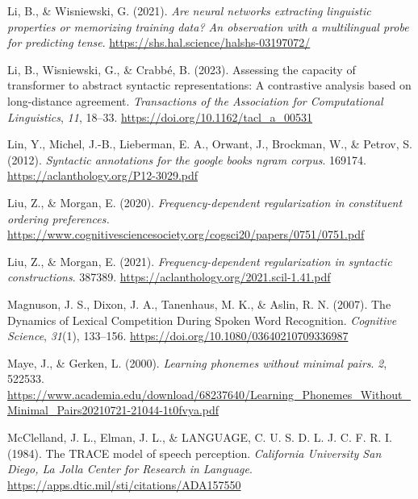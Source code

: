 \documentclass[
  12pt,
  letterpaper,
]{scrreprt}
\newlength{\cslhangindent}
\newenvironment{CSLReferences}[2] %
 {\begin{list}{}{%
  \setlength{\itemindent}{0pt}
  \setlength{\leftmargin}{0pt}
  \setlength{\parsep}{0pt}
  \ifodd #1
   \setlength{\leftmargin}{\cslhangindent}
   \setlength{\itemindent}{-1\cslhangindent}
  \fi
  \setlength{\itemsep}{#2\baselineskip}}}
 {\end{list}}
\begin{document}
\begin{CSLReferences}{1}{0}
Li, B., \& Wisniewski, G. (2021). \emph{Are neural networks extracting
linguistic properties or memorizing training data? An observation with a
multilingual probe for predicting tense}.
\url{https://shs.hal.science/halshs-03197072/}

Li, B., Wisniewski, G., \& Crabbé, B. (2023). Assessing the capacity of
transformer to abstract syntactic representations: A contrastive
analysis based on long-distance agreement. \emph{Transactions of the
Association for Computational Linguistics}, \emph{11}, 18--33.
\url{https://doi.org/10.1162/tacl_a_00531}

Lin, Y., Michel, J.-B., Lieberman, E. A., Orwant, J., Brockman, W., \&
Petrov, S. (2012). \emph{Syntactic annotations for the google books
ngram corpus}. 169174. \url{https://aclanthology.org/P12-3029.pdf}

Liu, Z., \& Morgan, E. (2020). \emph{Frequency-dependent regularization
in constituent ordering preferences.}
\url{https://www.cognitivesciencesociety.org/cogsci20/papers/0751/0751.pdf}

Liu, Z., \& Morgan, E. (2021). \emph{Frequency-dependent regularization
in syntactic constructions}. 387389.
\url{https://aclanthology.org/2021.scil-1.41.pdf}

Magnuson, J. S., Dixon, J. A., Tanenhaus, M. K., \& Aslin, R. N. (2007).
The Dynamics of Lexical Competition During Spoken Word Recognition.
\emph{Cognitive Science}, \emph{31}(1), 133--156.
\url{https://doi.org/10.1080/03640210709336987}

Maye, J., \& Gerken, L. (2000). \emph{Learning phonemes without minimal
pairs}. \emph{2}, 522533.
\url{https://www.academia.edu/download/68237640/Learning_Phonemes_Without_Minimal_Pairs20210721-21044-1t0fvya.pdf}

McClelland, J. L., Elman, J. L., \& LANGUAGE, C. U. S. D. L. J. C. F. R.
I. (1984). The TRACE model of speech perception. \emph{California
University San Diego, La Jolla Center for Research in Language}.
\url{https://apps.dtic.mil/sti/citations/ADA157550}


\end{CSLReferences}
\end{document}
